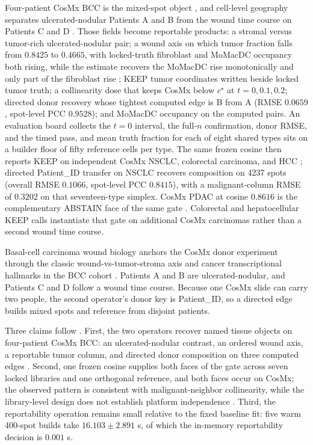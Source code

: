 Four-patient CosMx BCC is the mixed-spot object \citep{Andreatta2024zenodo,Yerly2022,Yerly2025preprint}, and cell-level geography separates ulcerated-nodular Patients A and B from the wound time course on Patients C and D \citep{Yerly2025preprint,Dvorak1986}. Those fields become reportable products: a stromal versus tumor-rich ulcerated-nodular pair; a wound axis on which tumor fraction falls from \(0.8425\) to \(0.4665\), with locked-truth fibroblast and MoMacDC occupancy both rising, while the estimate recovers the MoMacDC rise monotonically and only part of the fibroblast rise \citep{Yerly2025preprint,Dvorak1986}; KEEP tumor coordinates written beside locked tumor truth; a collinearity dose that keeps CosMx below \(c^\star\) at \(t=0,0.1,0.2\); directed donor recovery whose tightest computed edge is B from A (RMSE \(0.0659\), spot-level PCC \(0.9528\)); and MoMacDC occupancy on the computed pairs. An evaluation board collects the \(t=0\) interval, the full-\(n\) confirmation, donor RMSE, and the timed pass, and mean truth fraction for each of eight shared types sits on a builder floor of fifty reference cells per type. The same frozen cosine then reports KEEP on independent CosMx NSCLC, colorectal carcinoma, and HCC \citep{He2022,Crowell2025preprint,Sun2025spatial}; directed Patient\_ID transfer on NSCLC recovers composition on 4237 spots (overall RMSE \(0.1066\), spot-level PCC \(0.8415\)), with a malignant-column RMSE of \(0.3202\) on that seventeen-type simplex. CosMx PDAC at cosine \(0.8616\) is the complementary ABSTAIN face of the same gate \citep{Pei2025}. Colorectal and hepatocellular KEEP calls instantiate that gate on additional CosMx carcinomas rather than a second wound time course.

Basal-cell carcinoma wound biology anchors the CosMx donor experiment through the classic wound-vs-tumor-stroma axis \citep{Dvorak1986} and cancer transcriptional hallmarks in the BCC cohort \citep{Gavish2023,Yerly2022,Yerly2025preprint,Andreatta2024zenodo}. Patients A and B are ulcerated-nodular, and Patients C and D follow a wound time course. Because one CosMx slide can carry two people, the second operator's donor key is Patient\_ID, so a directed edge builds mixed spots and reference from disjoint patients.

Three claims follow \citep{Elhanani2023,Cable2022}. First, the two operators recover named tissue objects on four-patient CosMx BCC: an ulcerated-nodular contrast, an ordered wound axis, a reportable tumor column, and directed donor composition on three computed edges \citep{Andreatta2024zenodo,Yerly2025preprint}. Second, one frozen cosine supplies both faces of the gate across seven locked libraries and one orthogonal reference, and both faces occur on CosMx; the observed pattern is consistent with malignant-neighbor collinearity, while the library-level design does not establish platform independence \citep{Kiselev2018,deKanter2019,He2022,Crowell2025preprint,Pei2025}. Third, the reportability operation remains small relative to the fixed baseline fit: five warm 400-spot builds take \(16.103\pm2.891\) s, of which the in-memory reportability decision is \(0.001\) s.

